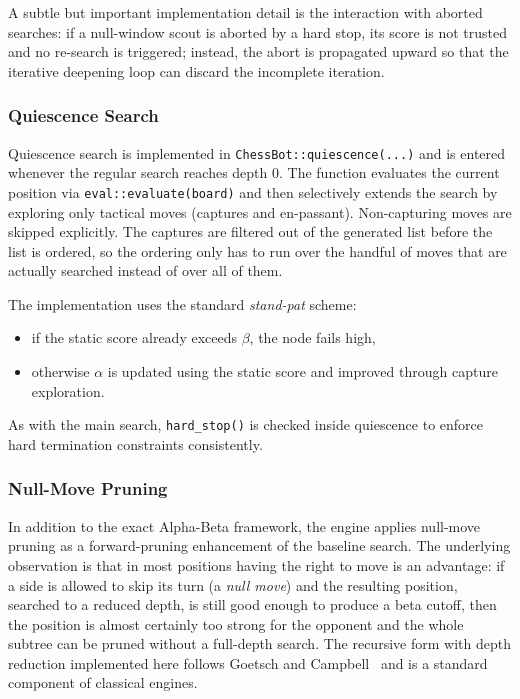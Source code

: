 A subtle but important implementation detail is the interaction with aborted
searches: if a null-window scout is aborted by a hard stop, its score is not
trusted and no re-search is triggered; instead, the abort is propagated upward
so that the iterative deepening loop can discard the incomplete iteration.

\subsubsection{Quiescence Search}
\label{subsec:quiescence_impl}

Quiescence search is implemented in \texttt{ChessBot::\allowbreak quiescence(...)} and is
entered whenever the regular search reaches depth $0$. The function evaluates
the current position via \texttt{eval::evaluate(board)} and then selectively
extends the search by exploring only tactical moves (captures and en-passant).
Non-capturing moves are skipped explicitly. The captures are filtered out of the
generated list before the list is ordered, so the ordering only has to run over
the handful of moves that are actually searched instead of over all of them.

The implementation uses the standard \emph{stand-pat} scheme:
\begin{itemize}
    \item if the static score already exceeds $\beta$, the node fails high,
    \item otherwise $\alpha$ is updated using the static score and improved
    through capture exploration.
\end{itemize}

As with the main search, \texttt{hard\_stop()} is checked inside quiescence to
enforce hard termination constraints consistently.

\subsubsection{Null-Move Pruning}
\label{subsec:null_move_pruning}

In addition to the exact Alpha-Beta framework, the engine applies null-move
pruning as a forward-pruning enhancement of the baseline search. The underlying
observation is that in most positions having the right to move is an advantage:
if a side is allowed to skip its turn (a \emph{null move}) and the resulting
position, searched to a reduced depth, is still good enough to produce a beta
cutoff, then the position is almost certainly too strong for the opponent and the
whole subtree can be pruned without a full-depth search. The recursive form with
depth reduction implemented here follows Goetsch and
Campbell~\cite{goetsch1990experiments} and is a standard component of classical
engines.

